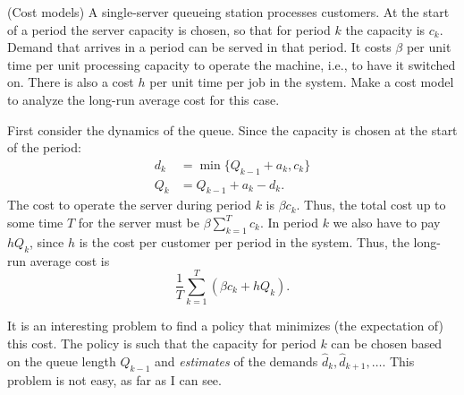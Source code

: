 \begin{exercise}(Cost models) A single-server queueing station
  processes customers. At the start of a period the server capacity is
  chosen, so that for period $k$ the capacity is $c_k$. Demand that
  arrives in a period can be served in that period. It costs $\beta$
  per unit time per unit processing capacity to operate the machine,
  i.e., to have it switched on. There is also a cost $h$ per unit time
  per job in the system. Make a cost model to analyze the long-run
  average cost for this case.
  \begin{solution}
First consider the dynamics of the queue. Since the capacity is chosen at the start of the period:
\begin{align*}
  d_k &= \min\{Q_{k-1}+a_k, c_k\} \\
Q_k &= Q_{k-1}+a_k - d_k.
\end{align*}
The cost to operate the server during period $k$ is $\beta c_k$.
Thus, the total cost up to some time $T$ for the server must be
$\beta \sum_{k=1}^T c_k$. In period $k$ we also have to pay $h Q_k$,
since $h$ is the cost per customer per period in the system. Thus, the
long-run average cost is
    \begin{equation*}
      \frac 1T\sum_{k=1}^T \left(\beta c_k + h Q_k\right).
    \end{equation*}

    It is an interesting problem to find a policy that minimizes (the
    expectation of) this cost. The policy is such that the capacity
    for period $k$ can be chosen based on the queue length $Q_{k-1}$
    and \emph{estimates} of the demands
    $\hat d_k, \hat d_{k+1}, \ldots$. This problem is not easy, as far as I can see. 

  \end{solution}
\end{exercise}

